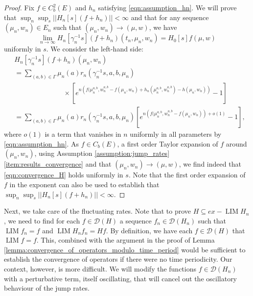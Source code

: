 \documentclass[a4paper]{article}
\newcommand{\cD}{\mathcal{D}}
\DeclareMathOperator*{\LIM}{LIM}
\newcommand{\vn}[1]{\left| \! \left| #1\right| \! \right|}
\numberwithin{equation}{section}
\theoremstyle{definition}
\begin{document}
\begin{proof}
	Fix $f \in C_b^2(E)$ and $h_n$ satisfying \eqref{eqn:assumption_hn}. We will prove that $\sup_n \sup_s \vn{H_n[s](f + h_n)} < \infty$ and that for any sequence $(\mu_n,w_n) \in E_n$ such that $(\mu_n,w_n) \rightarrow (\mu,w)$, we have
	\begin{equation} \label{eqn:convergence_H}
		\lim_{n \rightarrow \infty} H_n[\gamma_n^{-1} s](f + h_n)(t_n,\mu_n,w_n) = H_0[s]f(\mu,w)
	\end{equation}
	uniformly in $s$. We consider the left-hand side:
	\begin{align*}
		& H_n[\gamma_n^{-1} s] (f  + h_n)(\mu_n,w_n) \\
		& = \sum_{(a,b) \in\Gamma} \mu_n(a) r_n(\gamma_n^{-1} s, a,b,\mu_n) \\
		& \hspace{3cm} \times \left[e^{n \left(f(\mu_n^{a,b} , w_n^{a,b} - f(\mu_n,w_n)  + h_n(\mu_n^{a,b} ,w_n^{a,b} ) - h(\mu_n,w_n)\right)} - 1 \right] \\
		& = \sum_{(a,b) \in\Gamma} \mu_n(a) r_n(\gamma_n^{-1} s, a,b,\mu_n) \left[e^{n \left(f(\mu_n^{a,b} , w_n^{a,b} - f(\mu_n,w_n)\right) + o(1)} - 1 \right],
	\end{align*}
	where $o(1)$ is a term that vanishes in $n$ uniformly in all parameters by \eqref{eqn:assumption_hn}. As $f \in C_b(E)$, a first order Taylor expansion of $f$ around $\left(\mu_n,w_n\right)$, using Assumption \ref{assumption:jump_rates} \ref{item:results_convergence} and that $\left(\mu_n,w_n\right) \rightarrow (\mu,w)$, we find indeed that \eqref{eqn:convergence_H} holds uniformly in $s$. Note that the first order expansion of $f$ in the exponent can also be used to establish that $\sup_n \sup_s \vn{H_n[s] (f + h_n)} < \infty$.	
\end{proof}

Next, we take care of the fluctuating rates. Note that to prove $H \subseteq ex-\LIM H_n$, we need to find for each $f \in \cD(H)$ a sequence $f_n \in \cD(H_n)$ such that $\LIM f_n = f$ and $\LIM H_n f_n = Hf$. By definition, we have each $f \in \cD(H)$ that $\LIM f  = f$. This, combined with the argument in the proof of Lemma \ref{lemma:convergence_of_operators_modulo_time_period} would be sufficient to establish the convergence of operators if there were no time periodicity. Our context, however, is more difficult. We will modify the functions $f \in \cD(H_n)$ with a perturbative term, itself oscillating, that will cancel out the oscillatory behaviour of the jump rates.
\end{document}
